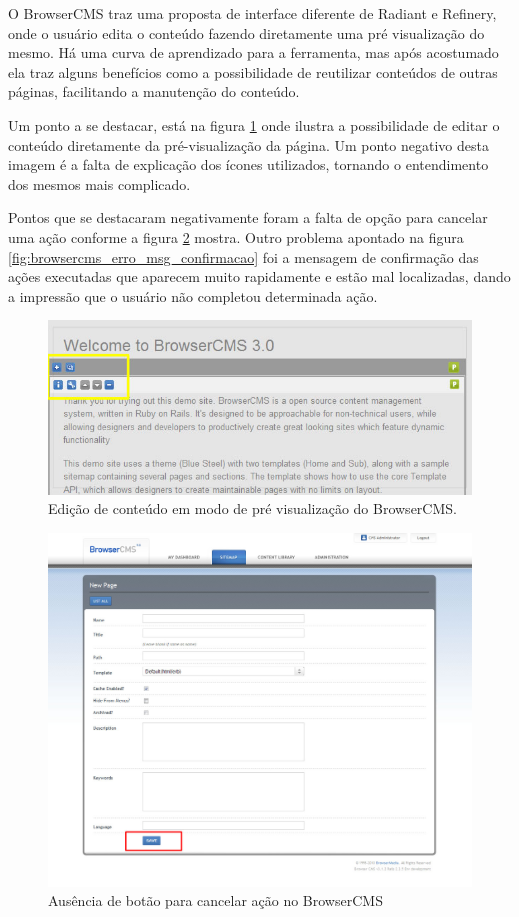O BrowserCMS traz uma proposta de interface diferente de Radiant e Refinery, onde o usuário edita o conteúdo fazendo diretamente uma pré visualização do mesmo. Há uma curva de aprendizado para a ferramenta, mas após acostumado ela traz alguns benefícios como a possibilidade de reutilizar conteúdos de outras páginas, facilitando a manutenção do conteúdo.

Um ponto a se destacar, está na figura \ref{fig:browsercms_neutro_icones} onde ilustra a possibilidade de editar o conteúdo diretamente da pré-visualização da página. Um ponto negativo desta imagem é a falta de explicação dos ícones utilizados, tornando o entendimento dos mesmos mais complicado.

Pontos que se destacaram negativamente foram a falta de opção para cancelar uma ação conforme a figura \ref{fig:browsercms_erro_cancel} mostra. Outro problema apontado na figura \ref{fig:browsercms_erro_msg_confirmacao} foi a mensagem de confirmação das ações executadas que aparecem muito rapidamente e estão  mal localizadas, dando a impressão que o usuário não completou determinada ação.

\begin{figure}[here]
\includegraphics[width=150mm]{images/browsercms_neutro_icones.jpg}
\caption{Edição de conteúdo em modo de pré visualização do BrowserCMS.}
\label{fig:browsercms_neutro_icones}
\end{figure}

\begin{figure}[here]
\includegraphics[width=150mm]{images/browsercms_erro_cancel.jpg}
\caption{Ausência de botão para cancelar ação no BrowserCMS}
\label{fig:browsercms_erro_cancel}
\end{figure}


